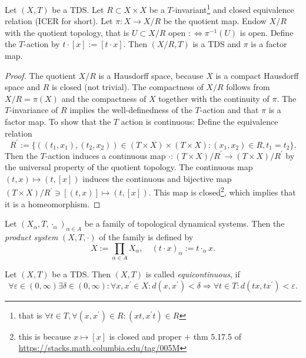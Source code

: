 \begin{proposition}
	Let $(X,T)$ be a TDS. Let $R \subset X \times X$ be a $T$-invariant\footnote{that is $\forall t \in T, \forall (x,x^\prime ) \in R : (xt ,x^\prime t) \in R$} and closed equivalence relation (ICER for short).
	Let $\pi : X \to X/R$ be the quotient map.
	Endow $X/R$ with the quotient topology, that is $U \subset X/R$ open $: \Leftrightarrow \pi^{-1}(U)$ is open.
	Define the $T$-action by $t \cdot [x] := [t \cdot x]$.
	Then $(X/R, T)$ is a TDS and $\pi$ is a factor map.
\end{proposition}
\begin{proof}
	The quotient $X/R$ is a Hausdorff space, because $X$ is a compact Hausdorff space and $R$ is closed (not trivial).
	The compactness of $X/R$ follows from $X/R = \pi (X)$ and the compactness of $X$ together with the continuity of $\pi$. The $T$-invariance of $R$ implies the well-definedness of the $T$-action and that $\pi$ is a factor map.
	To show that the $T$ action is continuous: Define the equivalence relation
	\begin{equation*}
		R^\prime := \{ ((t_1,x_1),(t_2,x_2)) \in (T \times X) \times (T \times X): (x_1, x_2) \in R, t_1 = t_2\}.
	\end{equation*}
	Then the $T$-action induces a continuous map $\cdot : (T \times X)/R^\prime \to (T\times X)/R^\prime$ by the universal property of the quotient topology.
	The continuous map $(t,x) \mapsto (t,[x])$ induces the continuous and bijective map $(T\times X)/R^\prime \ni [(t,x)] \mapsto ( t,[x])$. 
	This map is closed\footnote{this is because $x \mapsto [x]$ is closed and proper + thm 5.17.5 of \url{https://stacks.math.columbia.edu/tag/005M}}, which implies that it is a homeomorphism.
\end{proof}

\begin{definition}
	Let $(X_\alpha,T, \cdot_\alpha)_{\alpha \in A}$ be a family of topological dynamical systems.
	Then the \emph{product system} $(X, T, \cdot)$ of the family is defined by
	\begin{equation*}
		X := \prod_{\alpha \in A} X_\alpha, \quad (t \cdot x )_{\alpha} := t \cdot_\alpha x.
	\end{equation*}
\end{definition}

\begin{definition}
	Let $(X,T)$ be a TDS.
	Then $(X,T)$ is called \emph{equicontinuous}, if
	\begin{equation*}
		\forall \varepsilon \in (0, \infty) \exists \delta \in (0, \infty): \forall x , x^\prime \in X :  d(x, x^\prime) <\delta  \Rightarrow \forall t \in T: d(tx,tx^\prime) < \varepsilon.
	\end{equation*}
\end{definition}

